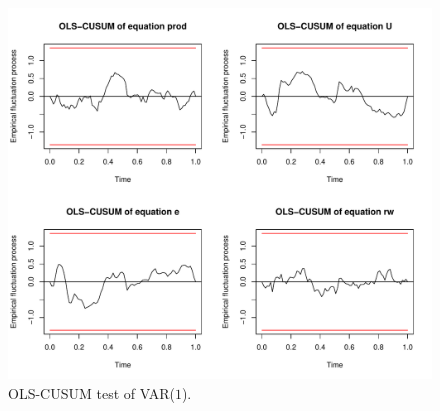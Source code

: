\documentclass[nojss]{jss}
\begin{document}
\begin{figure}[t!]
\centering  
\includegraphics{Figures/fig-4}
\caption{OLS-CUSUM test of VAR($1$).}
\label{fig-4}
\end{figure}
%
\end{document}
